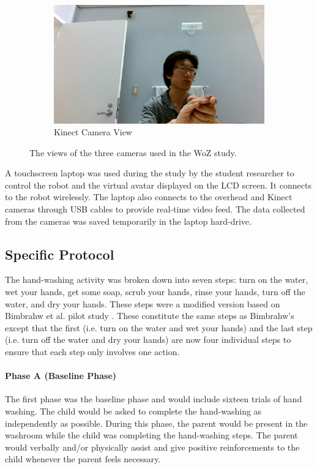 \begin{figure}[H]
	
	\begin{subfigure}[b]{0.49\textwidth}
		\includegraphics[width=1.1\linewidth]{./img/kinect_view}
		\caption{Kinect Camera View}
	\end{subfigure}%
	
	\caption{The views of the three cameras used in the WoZ study.}
	\label{fig:CameraViews}
\end{figure}


A touchscreen laptop was used during the study by the student researcher to control the robot and the virtual avatar displayed on the LCD screen. It connects to the robot wirelessly. The laptop also connects to the overhead and Kinect cameras through USB cables to provide real-time video feed. The data collected from the cameras was saved temporarily in the laptop hard-drive. 

\subsection{Specific Protocol}
\label{sec:SpecificProtocol}
The hand-washing activity was broken down into seven steps: turn on the water, wet your hands, get some soap, scrub your hands, rinse your hands, turn off the water, and dry your hands.  These steps were a modified version based on Bimbrahw et al. pilot study \cite{bimbrahw2012investigating}. These constitute the same steps as Bimbrahw's except that the first (i.e. turn on the water and wet your hands) and the last step (i.e. turn off the water and dry your hands) are now four individual steps to ensure that each step only involves one action.

\paragraph{Phase A (Baseline Phase)}
The first phase was the baseline phase and would include sixteen trials of hand washing. The child would be asked to complete the hand-washing as independently as possible. During this phase, the parent would be present in the washroom while the child was completing the hand-washing steps. The parent would verbally and/or physically assist and give positive reinforcements to the child whenever the parent feels necessary.

